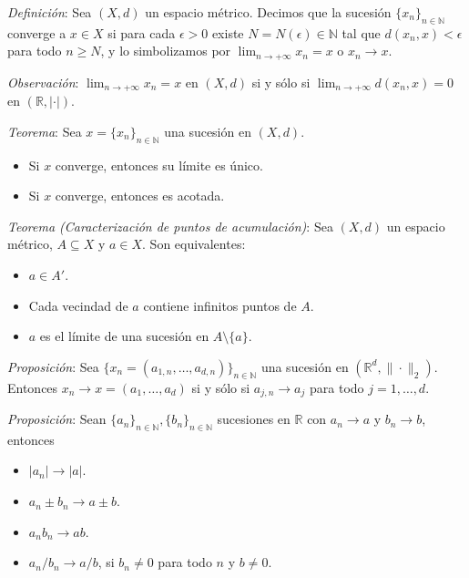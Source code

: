 \documentclass{beamer}
\begin{document}
  \begin{frame}
    \textit{Definición}: Sea $(X, d)$ un espacio métrico. Decimos que la sucesión
    $\{x_n\}_{n \in \mathbb{N}}$ converge a $x \in X$ si para cada $\epsilon > 0$
    existe $N = N(\epsilon) \in \mathbb{N}$ tal que $d(x_n, x) < \epsilon$ para todo
    $n \geq N$, y lo simbolizamos por $\lim_{n \to +\infty} x_n = x$ o $x_n \to x$.
    \newline\newline
    \pause

    \textit{Observación}: $\lim_{n \to +\infty} x_n = x$ en $(X, d)$ si y sólo si
    $\lim_{n \to +\infty} d(x_n, x) = 0$ en $(\mathbb{R}, |\cdot|)$.
    \newline\newline
    \pause

    \textit{Teorema}: Sea $x = \{x_n\}_{n \in \mathbb{N}}$ una sucesión en $(X, d)$.
    \begin{itemize}[<+->]
      \item Si $x$ converge, entonces su límite es único.
      \item Si $x$ converge, entonces es acotada.
    \end{itemize}
  \end{frame}

  \begin{frame}
    \textit{Teorema (Caracterización de puntos de acumulación)}: Sea $(X, d)$ un
    espacio métrico, $A \subseteq X$ y $a \in X$. Son equivalentes:
    \pause
    \begin{itemize}[<+->]
      \item $a \in A'$.
      \item Cada vecindad de $a$ contiene infinitos puntos de $A$.
      \item $a$ es el límite de una sucesión en $A \setminus \{a\}$.
    \end{itemize}
  \end{frame}

  \begin{frame}
    \textit{Proposición}: Sea $\{x_n = (a_{1,n}, \dots, a_{d,n})\}_{n \in \mathbb{N}}$
    una sucesión en $(\mathbb{R}^d, \|\cdot\|_2)$. Entonces
    $x_n \to x = (a_1, \dots, a_d)$ si y sólo si $a_{j,n} \to a_j$ para todo
    $j = 1, \dots, d$.
    \newline\newline
    \pause

    \textit{Proposición}: Sean $\{a_n\}_{n \in \mathbb{N}}, \{b_n\}_{n \in \mathbb{N}}$
    sucesiones en $\mathbb{R}$ con $a_n \to a$ y $b_n \to b$, entonces
    \pause
    \begin{itemize}[<+->]
      \item $|a_n| \to |a|$.
      \item $a_n \pm b_n \to a \pm b$.
      \item $a_n b_n \to ab$.
      \item $a_n / b_n \to a / b$, si $b_n \neq 0$ para todo $n$ y $b \neq 0$.
    \end{itemize}
  \end{frame}
\end{document}
